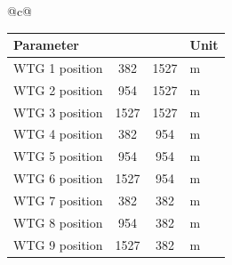 \documentclass[border=8pt]{standalone}
\begin{document}
\pagecolor{white}
\begin{tabular}{@{}c@{}}
\renewcommand{\arraystretch}{1.12}
\setlength{\tabcolsep}{10pt}
\begin{tabular}{l S[table-format=4.0] S[table-format=4.0] l}
\toprule
{}\textbf{Parameter} &
 &
 &
\textbf{Unit} \\
\midrule
WTG 1 position & 382  & 1527 & \si{\metre} \\
WTG 2 position & 954  & 1527 & \si{\metre} \\
WTG 3 position & 1527 & 1527 & \si{\metre} \\
WTG 4 position & 382  & 954  & \si{\metre} \\
WTG 5 position & 954  & 954  & \si{\metre} \\
WTG 6 position & 1527 & 954  & \si{\metre} \\
WTG 7 position & 382  & 382  & \si{\metre} \\
WTG 8 position & 954  & 382  & \si{\metre} \\
WTG 9 position & 1527 & 382  & \si{\metre} \\
\bottomrule
\end{tabular}
\end{tabular}
\end{document}
